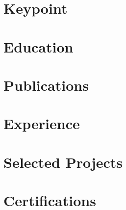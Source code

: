 \documentclass[10pt, letterpaper]{article}
\begin{document}
	
	
	
	
	\section{\faStar \ Keypoint}
	
	
	\section{\faUniversity\ Education}
	
	
	\section{\faNewspaper\ Publications}
	
	
	\section{\faBriefcase\ Experience}
	
	
	\section{\faCode\ Selected Projects}
	
	
	\section{\faCertificate\ Certifications}
	
	
%	
	
\end{document}
